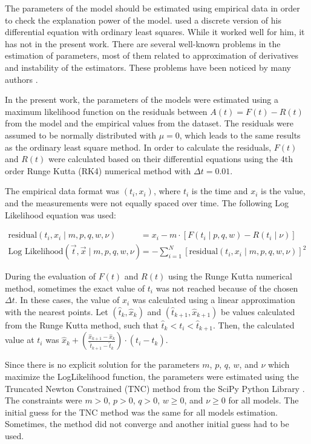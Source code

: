 The parameters of the model should be estimated using empirical data in order to check the explanation power of the model. \citet{bass1969} used a discrete version of his differential equation with ordinary least squares. While it worked well for him, it has not in the present work. There are several well-known problems in the estimation of parameters, most of them related to approximation of derivatives and instability of the estimators. These problems have been noticed by many authors \citep{schmittlein1982maximum, srinivasan1986technical, xie1997kalman}.

In the present work, the parameters of the models were estimated using a maximum likelihood function on the residuals between $A(t) = F(t) - R(t)$ from the model and the empirical values from the dataset. The residuals were assumed to be normally distributed with $\mu=0$, which leads to the same results as the ordinary least square method. In order to calculate the residuals, $F(t)$ and $R(t)$ were calculated based on their differential equations using the 4th order Runge Kutta (RK4) numerical method \citep{butcher1987numerical} with $\Delta t = 0.01$.

The empirical data format was $(t_i, x_i)$, where $t_i$ is the time and $x_i$ is the value, and the measurements were not equally spaced over time. The following Log Likelihood equation was used:

\begin{align}
\text{residual}(t_i, x_i \mid m, p, q, w, \nu) &= x_i - m \cdot \left[ F(t_i \mid p, q, w) - R(t_i \mid \nu) \right] \\
\text{Log Likelihood}(\vec{t}, \vec{x} \mid m, p, q, w, \nu) &= -\sum_{i=1}^{N} [\text{residual}(t_i, x_i \mid m, p, q, w, \nu)]^2
\end{align}

During the evaluation of $F(t)$ and $R(t)$ using the Runge Kutta numerical method, sometimes the exact value of $t_i$ was not reached because of the chosen $\Delta t$. In these cases, the value of $x_i$ was calculated using a linear approximation with the nearest points. Let $(\hat{t}_k, \hat{x}_k)$ and $(\hat{t}_{k+1}, \hat{x}_{k+1})$ be values calculated from the Runge Kutta method, such that $\hat{t}_k < t_i < \hat{t}_{k+1}$. Then, the calculated value at $t_i$ was $\hat{x}_k + \left( \frac{\hat{x}_{k+1} - \hat{x}_k}{\hat{t}_{k+1} - \hat{t}_k} \right) \cdot (t_i - \hat{t}_k)$.

Since there is no explicit solution for the parameters $m$, $p$, $q$, $w$, and $\nu$ which maximize the LogLikelihood function, the parameters were estimated using the Truncated Newton Constrained (TNC) method \citep{dembo1983truncated, nash2000survey, nash1984newton} from the SciPy Python Library \citep{scipy}. The constraints were $m > 0$, $p > 0$, $q > 0$, $w \geq 0$, and $\nu \geq 0$ for all models. The initial guess for the TNC method was the same for all models estimation. Sometimes, the method did not converge and another initial guess had to be used.

